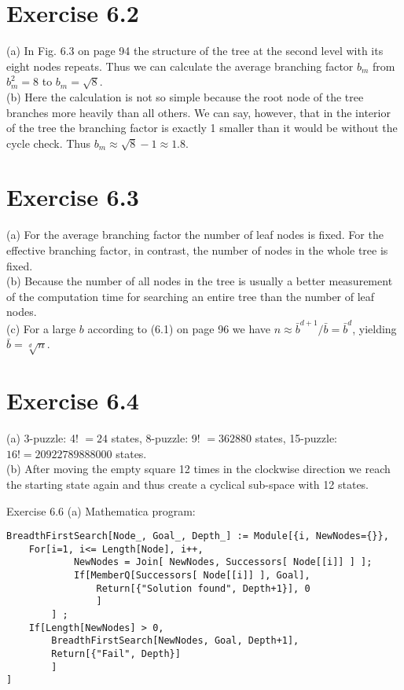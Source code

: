 \documentclass[10pt]{article}
\begin{document}
\section*{Exercise 6.2}
(a) In Fig. 6.3 on page 94 the structure of the tree at the second level with its eight nodes repeats. Thus we can calculate the average branching factor $b_{m}$ from $b_{m}^{2}=8$ to $b_{m}=\sqrt{8}$.\\
(b) Here the calculation is not so simple because the root node of the tree branches more heavily than all others. We can say, however, that in the interior of the tree the branching factor is exactly 1 smaller than it would be without the cycle check. Thus $b_{m} \approx \sqrt{8}-1 \approx 1.8$.

\section*{Exercise 6.3}
(a) For the average branching factor the number of leaf nodes is fixed. For the effective branching factor, in contrast, the number of nodes in the whole tree is fixed.\\
(b) Because the number of all nodes in the tree is usually a better measurement of the computation time for searching an entire tree than the number of leaf nodes.\\
(c) For a large $b$ according to (6.1) on page 96 we have $n \approx \bar{b}^{d+1} / \bar{b}=\bar{b}^{d}$, yielding $\bar{b}=\sqrt[d]{n}$.

\section*{Exercise 6.4}
(a) 3-puzzle: 4! $=24$ states, 8-puzzle: 9! $=362880$ states, 15-puzzle: $16!=20922789888000$ states.\\
(b) After moving the empty square 12 times in the clockwise direction we reach the starting state again and thus create a cyclical sub-space with 12 states.

Exercise 6.6 (a) Mathematica program:

\begin{verbatim}
BreadthFirstSearch[Node_, Goal_, Depth_] := Module[{i, NewNodes={}},
    For[i=1, i<= Length[Node], i++,
            NewNodes = Join[ NewNodes, Successors[ Node[[i]] ] ];
            If[MemberQ[Successors[ Node[[i]] ], Goal],
                Return[{"Solution found", Depth+1}], 0
                ]
        ] ;
    If[Length[NewNodes] > 0,
        BreadthFirstSearch[NewNodes, Goal, Depth+1],
        Return[{"Fail", Depth}]
        ]
]
\end{verbatim}
\end{document}
